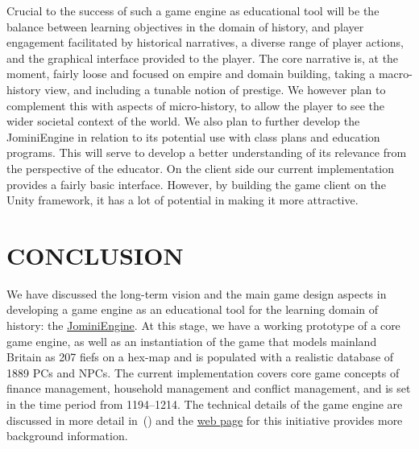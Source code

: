 \documentclass[11pt]{article}
\newcommand{\hwlcomment}[1]{$\spadesuit$\textsc{#1}$\spadesuit$}
\renewcommand{\hwlcomment}[1]{}
\begin{document}

Crucial to the success of such a game engine as educational tool will be the balance between learning
objectives in the domain of history, and player engagement facilitated by historical narratives, a diverse
range of player actions, and the graphical interface provided to the player. The core narrative is, at the
moment, fairly loose and focused on empire and domain building, taking a macro-history view, and including a
tunable notion of prestige. We however plan to complement this with aspects of micro-history, to allow the
player to see the wider societal context of the world. We also plan to further develop the JominiEngine
in relation to its potential use with class plans and education programs. This will serve to develop a better
understanding of its relevance from the perspective of the educator.  On the client side our current
implementation provides a fairly basic interface. However, by building the game client on the Unity framework,
it has a lot of potential in making it more attractive.

\hwlcomment{need to add more on game narrative and immersive player experience here}


\section*{CONCLUSION}

We have discussed the long-term vision and the main game design aspects in
developing a game engine as an educational tool for the learning domain of history: the \href{http://www.macs.hw.ac.uk/~hwloidl/Projects/JominiEngine/}{JominiEngine}. %
At this stage, we have a working prototype of a core game engine, as well as an instantiation of the game
that models mainland Britain as 207 fiefs on a hex-map and is populated
with a realistic database of 1889 PCs and NPCs. The current implementation covers
core game concepts of finance management, household management and conflict management, and
is set in the time period from 1194--1214.
The technical details of the game engine are discussed in more detail
in~(\cite{GALA15}) and the \href{http://www.macs.hw.ac.uk/~hwloidl/Projects/JominiEngine/}{web page} for this initiative provides more background information. %
\end{document}
